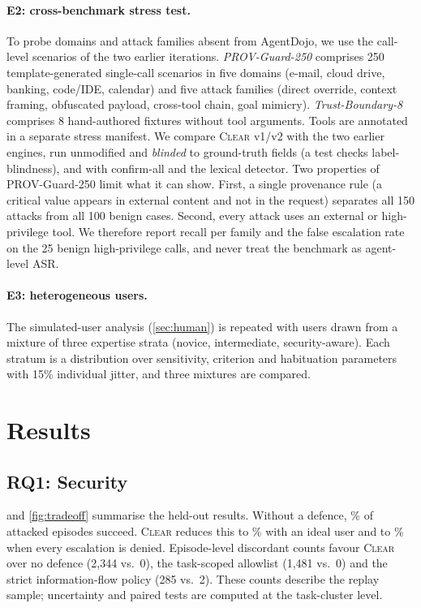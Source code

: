 \documentclass[preprint,12pt,nonatbib]{elsarticle}
\theoremstyle{remark}
\newcommand{\clear}{\textsc{Clear}}
\begin{document}
\paragraph{E2: cross-benchmark stress test.} To probe domains and attack
families absent from AgentDojo, we use the call-level scenarios of the two
earlier iterations. \emph{PROV-Guard-250} comprises 250 template-generated
single-call scenarios in five domains (e-mail, cloud drive, banking, code/IDE,
calendar) and five attack families (direct override, context framing,
obfuscated payload, cross-tool chain, goal mimicry). \emph{Trust-Boundary-8}
comprises 8 hand-authored fixtures without tool arguments. Tools are annotated
in a separate stress manifest. We compare \clear{} v1/v2 with the two earlier
engines, run unmodified and \emph{blinded} to ground-truth fields (a test checks
label-blindness), and with confirm-all and the lexical detector. Two properties
of PROV-Guard-250 limit what it can show. First, a single provenance rule (a
critical value appears in external content and not in the request) separates
all 150 attacks from all 100 benign cases. Second, every attack uses an
external or high-privilege tool. We therefore report recall per family and the
false escalation rate on the 25 benign high-privilege calls, and never treat
the benchmark as agent-level ASR.

\paragraph{E3: heterogeneous users.} The simulated-user analysis
(\cref{sec:human}) is repeated with users drawn from a mixture of three
expertise strata (novice, intermediate, security-aware). Each stratum is a
distribution over sensitivity, criterion and habituation parameters with 15\%
individual jitter, and three mixtures are compared.

\section{Results}
\label{sec:results}



\subsection{RQ1: Security}
\label{sec:rq1}
 and \cref{fig:tradeoff} summarise the held-out results. Without
a defence, \asrNone\% of attacked episodes succeed. \clear{} reduces this to
\asrClearO\% \asrClearOCI{} with an ideal user and to \asrClearA\% when every
escalation is denied. Episode-level discordant counts favour \clear{} over no defence (2{,}344
vs.\ 0), the task-scoped allowlist (1{,}481 vs.\ 0) and the strict
information-flow policy (285 vs.\ 2). These counts describe the replay sample;
uncertainty and paired tests are computed at the task-cluster level.
\end{document}
